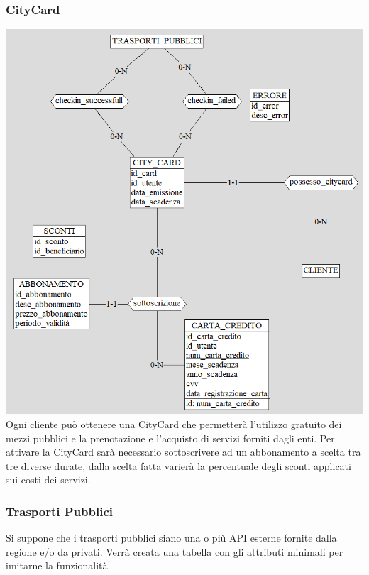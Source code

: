 \subsubsection{CityCard}
\includegraphics[width=0.95\columnwidth]{images/CityCard.png} \\
Ogni cliente può ottenere una CityCard che permetterà l'utilizzo gratuito dei mezzi pubblici e la prenotazione e l'acquisto di servizi forniti dagli enti. Per attivare la CityCard sarà necessario sottoscrivere ad un abbonamento a scelta tra tre diverse durate, dalla scelta fatta varierà la percentuale degli sconti applicati sui costi dei servizi.

\subsubsection{Trasporti Pubblici}
Si suppone che i trasporti pubblici siano una o più API esterne fornite dalla regione e/o da privati. Verrà creata una tabella con gli attributi minimali per imitarne la funzionalità. 


